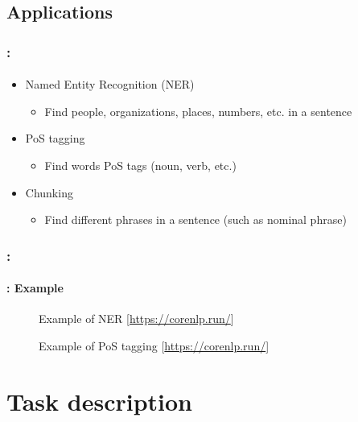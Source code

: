 \documentclass[xcolor=table]{beamer}
\begin{document}
\subsection{Applications}

\begin{frame}
	\frametitle{\insertshortsubtitle: \insertsection}
	\framesubtitle{\insertsubsection}

	\begin{itemize}
		\item Named Entity Recognition (NER)
		\begin{itemize}
			\item Find people, organizations, places, numbers, etc. in a sentence
		\end{itemize}
		\item PoS tagging
		\begin{itemize}
			\item Find words PoS tags (noun, verb, etc.)
		\end{itemize}
		\item Chunking
		\begin{itemize}
			\item Find different phrases in a sentence (such as nominal phrase)
		\end{itemize}
	\end{itemize}

\end{frame}

\begin{frame}
	\frametitle{\insertshortsubtitle: \insertsection}
	\framesubtitle{\insertsubsection: Example}

	\begin{figure}
		\centering
		\caption{Example of NER [\url{https://corenlp.run/}]}
	\end{figure}
	
	\begin{figure}
		\centering
		\caption{Example of PoS tagging [\url{https://corenlp.run/}]}
	\end{figure}

\end{frame}


\section{Task description}
\end{document}
